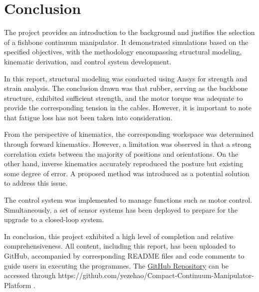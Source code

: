 \section{Conclusion} 
The project provides an introduction to the background and justifies the selection of a  fishbone continuum manipulator. 
It demonstrated simulations based on the specified objectives, with the methodology encompassing structural modeling, 
kinematic derivation, and control system development.

In this report, structural modeling was conducted using Ansys for strength and strain analysis. The conclusion drawn was that 
rubber, serving as the backbone structure, exhibited sufficient strength, and the motor torque was adequate to provide the 
corresponding tension in the cables. However, it is important to note that fatigue loss has not been taken into consideration.

From the perspective of kinematics, the corresponding workspace was determined through forward kinematics. However, a limitation 
was observed in that a strong correlation exists between the majority of positions and orientations. On the other hand, inverse 
kinematics accurately reproduced the posture but existing some degree of error. A proposed method was introduced as a potential 
solution to address this issue.

The control system was implemented to manage functions such as motor control. Simultaneously, a set of sensor systems has 
been deployed to prepare for the upgrade to a closed-loop system.

In conclusion, this project exhibited a high level of completion and relative comprehensiveness. All content, including this 
report, has been uploaded to GitHub, accompanied by corresponding README files and code comments to guide users in executing 
the programmes. The \href{https://github.com/yezehao/Compact-Continuum-Manipulator-Platform}{GitHub Repository} can be accessed 
through https://github.com/yezehao/Compact-Continuum-Manipulator-Platform .



\newpage
